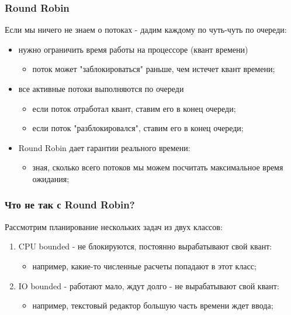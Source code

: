 \begin{frame}
\frametitle{Round Robin}

Если мы ничего не знаем о потоках - дадим каждому по чуть-чуть по очереди:
\begin{itemize}
  \item<2-> нужно ограничить время работы на процессоре (квант времени)
        \begin{itemize}
          \item поток может "заблокироваться" раньше, чем истечет квант времени;
        \end{itemize}
  \item<3-> все активные потоки выполняются по очереди
        \begin{itemize}
          \item если поток отработал квант, ставим его в конец очереди;
          \item если поток "разблокировался", ставим его в конец очереди;
        \end{itemize}
  \item<4-> Round Robin дает гарантии реального времени:
        \begin{itemize}
          \item зная, сколько всего потоков мы можем посчитать максимальное
                время ожидания;
        \end{itemize}
\end{itemize}
\end{frame}

\begin{frame}
\frametitle{Что не так с Round Robin?}

Рассмотрим планирование нескольких задач из двух классов:
\begin{enumerate}
  \item<2-> CPU bounded - не блокируются, постоянно вырабатывают свой квант:
        \begin{itemize}
          \item например, какие-то численные расчеты попадают в этот класс;
        \end{itemize}
  \item<3-> IO bounded - работают мало, ждут долго - не вырабатывают свой квант:
        \begin{itemize}
          \item например, текстовый редактор большую часть времени ждет ввода;
        \end{itemize}
\end{enumerate}
\end{frame}

